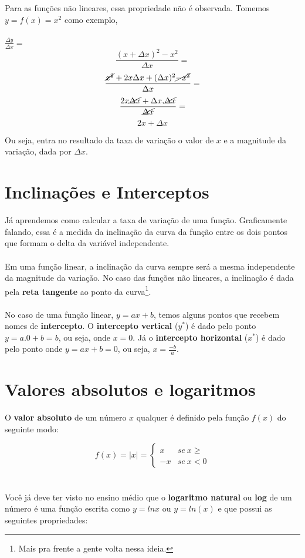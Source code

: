\documentclass[a4paper,11pt,oneside]{book}
\theoremstyle{definition}
\theoremstyle{break}
\begin{document}
Para as funções não lineares, essa propriedade não é observada. Tomemos $y = f(x) = x^2$ como exemplo,
\\~\\
\Large $ \frac{\Delta y}{\Delta x} = $ \normalsize
$$ \frac{(x + \Delta x)^2 - x^2}{\Delta x} = $$ 
$$  \frac{\cancel{x^2} + 2x \Delta x + (\Delta x)^2 \cancel{-x^2}}{\Delta x} = $$
$$  \frac{2x \cancel{\Delta x} + \Delta x . \cancel{\Delta x}}{\cancel{\Delta x}} = $$
$$  2x + \Delta x $$

Ou seja, entra no resultado da taxa de variação o valor de $x$ e a magnitude da variação, dada por $\Delta x$.

\section*{Inclinações e Interceptos}

Já aprendemos como calcular a taxa de variação de uma função. Graficamente falando, essa é a medida da inclinação da curva da função entre os dois pontos que formam o delta da variável independente. 
\\~\\
Em uma função linear, a inclinação da curva sempre será a mesma independente da magnitude da variação. No caso das funções não lineares, a inclinação é dada pela \textbf{reta tangente} ao ponto da curva\footnote{Mais pra frente a gente volta nessa ideia.}.
\\~\\
No caso de uma função linear, $ y = ax + b$, temos alguns pontos que recebem nomes de \textbf{intercepto}. O \textbf{intercepto vertical} ($y^*$) é dado pelo ponto $y = a.0 + b = b$, ou seja, onde $x = 0$. Já o \textbf{intercepto horizontal} ($x^*$) é dado pelo ponto onde $y = ax + b = 0 $, ou seja, $ x = \frac{-b}{a}$.

\section*{Valores absolutos e logaritmos}

O \textbf{valor absoluto} de um número $x$ qualquer é definido pela função $f(x)$ do seguinte modo:

\[ f(x) = |x| = \begin{cases} x & se \ x \geqslant \\ -x & se \ x < 0 \end{cases} \]
\\~\\
Você já deve ter visto no ensino médio que o \textbf{logaritmo natural} ou \textbf{log} de um número é uma função escrita como $y = lnx$ ou $y = ln(x)$ e que possui as seguintes propriedades:
\end{document}
